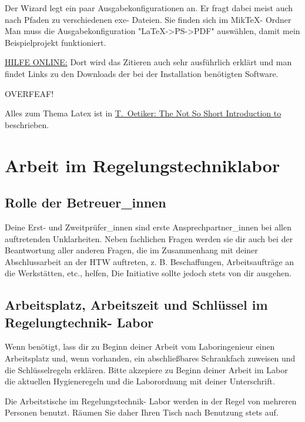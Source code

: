 Der Wizard legt ein paar Ausgabekonfigurationen an. Er fragt dabei meist auch nach Pfaden zu verschiedenen exe- Dateien. Sie finden sich im MikTeX- Ordner 
Man muss die Ausgabekonfiguration "LaTeX->PS->PDF" auswählen, damit mein Beispielprojekt funktioniert. 

\hyperlink {https://latex.tugraz.at/}{HILFE ONLINE:}
Dort wird das Zitieren auch sehr ausführlich erklärt und man findet Links zu den Downloads der bei der Installation benötigten Software.

OVERFEAF!




Alles zum Thema Latex ist in
\href{https://tobi.oetiker.ch/lshort/lshort.pdf}{T.~Oetiker: The Not So Short Introduction to \LaTeXe}
beschrieben.

\section{Arbeit im Regelungstechniklabor}

\subsection{Rolle der Betreuer\_innen}
Deine Erst- und Zweitprüfer\_innen sind erste Ansprechpartner\_innen bei allen auftretenden Unklarheiten. Neben fachlichen Fragen werden sie dir auch bei der Beantwortung aller anderen Fragen, die im Zusammenhang mit deiner Abschlussarbeit an der HTW auftreten, z. B. Beschaffungen, Arbeitsaufträge an die Werkstätten, etc., helfen,  Die Initiative sollte jedoch stets von dir ausgehen.


\subsection{Arbeitsplatz, Arbeitszeit und Schlüssel im Regelungtechnik- Labor}

Wenn benötigt, lass dir zu Beginn deiner Arbeit vom Laboringenieur einen Arbeitsplatz und, wenn vorhanden, ein abschließbares Schrankfach zuweisen und die Schlüsselregeln  erklären. Bitte akzepiere zu Beginn deiner Arbeit im Labor die aktuellen Hygieneregeln und die Laborordnung mit deiner Unterschrift.

Die Arbeitstische im Regelungstechnik- Labor werden in der Regel von mehreren Personen benutzt. Räumen Sie daher Ihren Tisch nach Benutzung stets auf.

